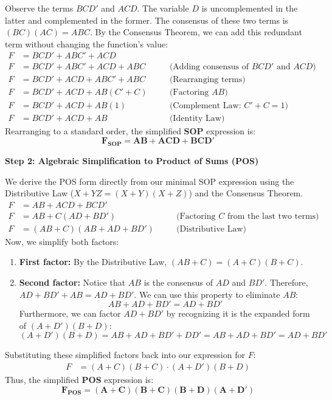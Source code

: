 \documentclass[12pt,a3paper]{article}
\begin{document}
\begin{enumerate}
\begin{tcolorbox}[enhanced,breakable,ansbox,colback=cA!4,colframe=cA,boxrule=0.8pt,arc=5pt,title={\textbf{Answer}},fonttitle=\bfseries\color{white},colbacktitle=cA]
Observe the terms $BCD'$ and $ACD$. The variable $D$ is uncomplemented in the latter and complemented in the former. The consensus of these two terms is $(BC)(AC) = ABC$. By the Consensus Theorem, we can add this redundant term without changing the function's value:
\begin{align*}
F &= BCD' + ABC' + ACD \\
F &= BCD' + ABC' + ACD + ABC \quad &&\text{(Adding consensus of } BCD' \text{ and } ACD \text{)} \\
F &= BCD' + ACD + ABC' + ABC \quad &&\text{(Rearranging terms)} \\
F &= BCD' + ACD + AB(C' + C) \quad &&\text{(Factoring } AB \text{)} \\
F &= BCD' + ACD + AB(1) \quad &&\text{(Complement Law: } C' + C = 1 \text{)} \\
F &= BCD' + ACD + AB \quad &&\text{(Identity Law)}
\end{align*}
Rearranging to a standard order, the simplified \textbf{SOP} expression is:
\[ \mathbf{F_{SOP} = AB + ACD + BCD'} \]

\vspace{0.3cm}
\textbf{Step 2: Algebraic Simplification to Product of Sums (POS)}

We derive the POS form directly from our minimal SOP expression using the Distributive Law ($X + YZ = (X + Y)(X + Z)$) and the Consensus Theorem.
\begin{align*}
F &= AB + ACD + BCD' \\
F &= AB + C(AD + BD') \quad &&\text{(Factoring } C \text{ from the last two terms)} \\
F &= (AB + C)(AB + AD + BD') \quad &&\text{(Distributive Law)}
\end{align*}
Now, we simplify both factors:
\begin{enumerate}
    \item \textbf{First factor:} By the Distributive Law, $(AB + C) = (A + C)(B + C)$.
    \item \textbf{Second factor:} Notice that $AB$ is the consensus of $AD$ and $BD'$. Therefore, $AD + BD' + AB = AD + BD'$. We can use this property to eliminate $AB$:
    \[ AB + AD + BD' = AD + BD' \]
    Furthermore, we can factor $AD + BD'$ by recognizing it is the expanded form of $(A + D')(B + D)$:
    \[ (A + D')(B + D) = AB + AD + BD' + DD' = AB + AD + BD' = AD + BD' \]
\end{enumerate}
Substituting these simplified factors back into our expression for $F$:
\begin{align*}
F &= (A + C)(B + C) \cdot (A + D')(B + D)
\end{align*}
Thus, the simplified \textbf{POS} expression is:
\[ \mathbf{F_{POS} = (A + C)(B + C)(B + D)(A + D')} \]


\end{tcolorbox}
\end{enumerate}
\end{document}
